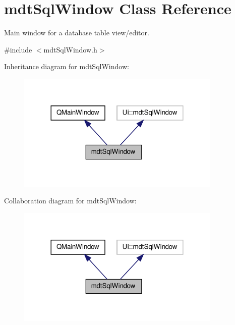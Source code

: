 \hypertarget{classmdt_sql_window}{\section{mdt\-Sql\-Window Class Reference}
\label{classmdt_sql_window}
}


Main window for a database table view/editor.  




{\ttfamily \#include $<$mdt\-Sql\-Window.\-h$>$}



Inheritance diagram for mdt\-Sql\-Window\-:
\nopagebreak
\begin{figure}[H]
\begin{center}
\leavevmode
\includegraphics[width=276pt]{classmdt_sql_window__inherit__graph}
\end{center}
\end{figure}


Collaboration diagram for mdt\-Sql\-Window\-:
\nopagebreak
\begin{figure}[H]
\begin{center}
\leavevmode
\includegraphics[width=276pt]{classmdt_sql_window__coll__graph}
\end{center}
\end{figure}
